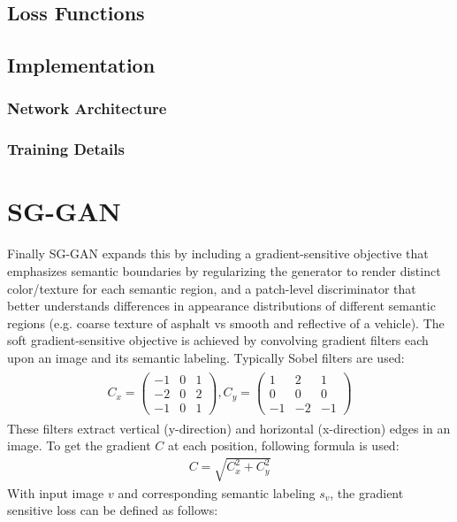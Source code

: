 \subsection{Loss Functions}
\subsection{Implementation}
\subsubsection{Network Architecture}
\subsubsection{Training Details}

\section{SG-GAN}
Finally SG-GAN \cite{DBLP:journals/corr/abs-1801-01726} expands this by including a gradient-sensitive objective that emphasizes semantic boundaries by regularizing the generator to render distinct color/texture for each semantic region, and a patch-level discriminator that better understands differences in appearance distributions of different semantic regions (e.g. coarse texture of asphalt vs smooth and reflective of a vehicle). The soft gradient-sensitive objective is achieved by convolving gradient filters each upon an image and its semantic labeling. Typically Sobel filters are used:
\begin{align}
	\begin{array}{cc}
		C_x = 
		\begin{pmatrix}
			-1 & 0 & 1\\
			-2 & 0 & 2\\
			-1 & 0 & 1
		\end{pmatrix},
		C_y = 
		\begin{pmatrix}
			1 & 2 & 1\\
			0 & 0 & 0\\
			-1 & -2 & -1
		\end{pmatrix}
	\end{array}
\end{align}
These filters extract vertical (y-direction) and horizontal (x-direction) edges in an image. To get the gradient $C$ at each position, following formula is used:
\begin{align}
	C = \sqrt{C_x^2 + C_y^2}
\end{align}
With input image $v$ and corresponding semantic labeling $s_v$, the gradient sensitive loss can be defined as follows:
